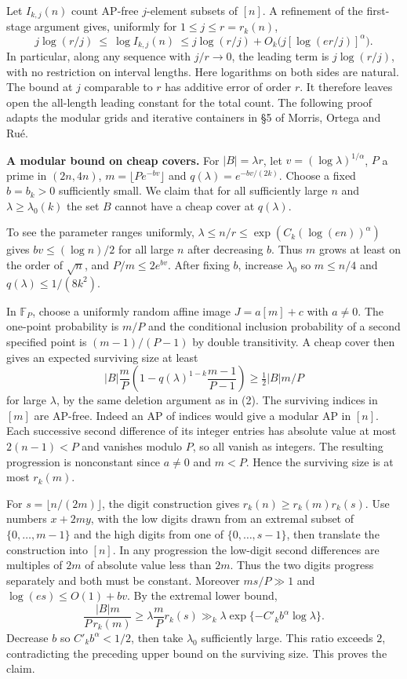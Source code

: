 \documentclass[10pt]{article}
\begin{document}
Let \(I_{k,j}(n)\) count AP-free \(j\)-element subsets of \([n]\). A refinement of the first-stage argument gives, uniformly for \(1\le j\le r=r_k(n)\), \[
j\log(r/j)\ \le\ \log I_{k,j}(n)\
\le j\log(r/j)+O_k\big(j[\log(e r/j)]^\alpha\big). \tag{6}
\] In particular, along any sequence with \(j/r\to0\), the leading term is \(j\log(r/j)\), with no restriction on interval lengths. Here logarithms on both sides are natural. The bound at \(j\) comparable to \(r\) has additive error of order \(r\). It therefore leaves open the all-length leading constant for the total count. The following proof adapts the modular grids and iterative containers in §5 of Morris, Ortega and Rué.

\textbf{A modular bound on cheap covers.} For \(|B|=\lambda r\), let \(v=(\log\lambda)^{1/\alpha}\), \(P\) a prime in \((2n,4n)\), \(m=\lfloor P e^{-b v}\rfloor\) and \(q(\lambda)=e^{-bv/(2k)}\). Choose a fixed \(b=b_k>0\) sufficiently small. We claim that for all sufficiently large \(n\) and \(\lambda\ge\lambda_0(k)\) the set \(B\) cannot have a cheap cover at \(q(\lambda)\).

To see the parameter ranges uniformly, \(\lambda\le n/r\le \exp(C_k(\log(en))^\alpha)\) gives \(bv\le (\log n)/2\) for all large \(n\) after decreasing \(b\). Thus \(m\) grows at least on the order of \(\sqrt n\), and \(P/m\le 2e^{bv}\). After fixing \(b\), increase \(\lambda_0\) so \(m\le n/4\) and \(q(\lambda)\le1/(8k^2)\).

In \(\mathbb F_P\), choose a uniformly random affine image \(J=a[m]+c\) with \(a\ne0\). The one-point probability is \(m/P\) and the conditional inclusion probability of a second specified point is \((m-1)/(P-1)\) by double transitivity. A cheap cover then gives an expected surviving size at least \[
|B|\frac mP \left(1-q(\lambda)^{1-k}\frac{m-1}{P-1}\right)
\ge \tfrac12 |B|m/P
\] for large \(\lambda\), by the same deletion argument as in (2). The surviving indices in \([m]\) are AP-free. Indeed an AP of indices would give a modular AP in \([n]\). Each successive second difference of its integer entries has absolute value at most \(2(n-1)<P\) and vanishes modulo \(P\), so all vanish as integers. The resulting progression is nonconstant since \(a\ne0\) and \(m<P\). Hence the surviving size is at most \(r_k(m)\).

For \(s=\lfloor n/(2m)\rfloor\), the digit construction gives \(r_k(n)\ge r_k(m)r_k(s)\). Use numbers \(x+2my\), with the low digits drawn from an extremal subset of \(\{0,\ldots,m-1\}\) and the high digits from one of \(\{0,\ldots,s-1\}\), then translate the construction into \([n]\). In any progression the low-digit second differences are multiples of \(2m\) of absolute value less than \(2m\). Thus the two digits progress separately and both must be constant. Moreover \(ms/P\gg1\) and \(\log(es)\le O(1)+bv\). By the extremal lower bound, \[
\frac{|B|m}{P\,r_k(m)}
\ge \lambda\frac{m}{P}r_k(s)
\gg_k \lambda\exp\{-C'_k b^\alpha\log\lambda\}.
\] Decrease \(b\) so \(C'_k b^\alpha<1/2\), then take \(\lambda_0\) sufficiently large. This ratio exceeds \(2\), contradicting the preceding upper bound on the surviving size. This proves the claim.
\end{document}

